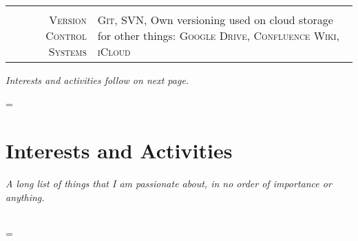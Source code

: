 \documentclass[a4paper,10pt,notitlepage]{article}
\newenvironment{absolutelynopagebreak}
  {\par\nobreak\vfil\penalty0\vfilneg
   \vtop\bgroup}
  {\par\xdef\tpd{\the\prevdepth}\egroup
   \prevdepth=\tpd}
\begin{document}
\begin{absolutelynopagebreak}
\begin{tabular}{r|p{11cm}}
		\multicolumn{2}{c}{} \\
		 
		\textsc{Version Control Systems}  & \textsc{Git}, \textsc{SVN}, Own versioning used on cloud storage for other things: \textsc{Google Drive}, \textsc{Confluence Wiki}, \textsc{iCloud} \\    
		 
	\end{tabular}
	
	\textit{Interests and activities follow on next page.}
	
\end{absolutelynopagebreak}
	
\begin{absolutelynopagebreak}
	
	\section{Interests and Activities}
	
	\textit{A long list of things that I am passionate about, in no order of importance or anything.} \\
	
	\begin{tabular}{r|p{11cm}}
		

\end{tabular}
\end{absolutelynopagebreak}
\end{document}
